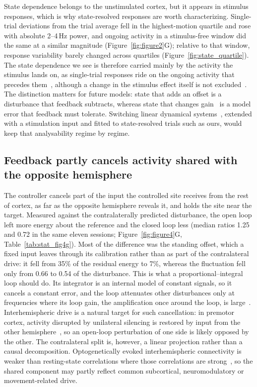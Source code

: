 State dependence belongs to the unstimulated cortex, but it appears in stimulus responses, which is why state-resolved responses are worth characterizing. Single-trial deviations from the trial average fell in the highest-motion quartile and rose with absolute 2--4\,Hz power, and ongoing activity in a stimulus-free window did the same at a similar magnitude (Figure~\ref{fig:figure2}G); relative to that window, response variability barely changed across quartiles (Figure~\ref{fig:state_quartile}). The state dependence we see is therefore carried mainly by the activity the stimulus lands on, as single-trial responses ride on the ongoing activity that precedes them~\citep{Arieli1996,Shimaoka2019}, although a change in the stimulus effect itself is not excluded~\citep{Mateo2011}. The distinction matters for future models: state that adds an offset is a disturbance that feedback subtracts, whereas state that changes gain~\citep{Goris2014} is a model error that feedback must tolerate. Switching linear dynamical systems~\citep{linderman2017rslds}, extended with a stimulation input and fitted to state-resolved trials such as ours, would keep that analysability regime by regime.

\subsection*{Feedback partly cancels activity shared with the opposite hemisphere}

The controller cancels part of the input the controlled site receives from the rest of cortex, as far as the opposite hemisphere reveals it, and holds the site near the target. Measured against the contralaterally predicted disturbance, the open loop left more energy about the reference and the closed loop less (median ratios 1.25 and 0.72 in the same eleven sessions; Figure~\ref{fig:figure4}G, Table~\ref{tab:stat_fig4g}). Most of the difference was the standing offset, which a fixed input leaves through its calibration rather than as part of the contralateral drive: it fell from 35\% of the residual energy to 7\%, whereas the fluctuation fell only from 0.66 to 0.54 of the disturbance. This is what a proportional--integral loop should do. Its integrator is an internal model of constant signals, so it cancels a constant error, and the loop attenuates other disturbances only at frequencies where its loop gain, the amplification once around the loop, is large~\citep{francis1976internal,astrom2008feedback}. Interhemispheric drive is a natural target for such cancellation: in premotor cortex, activity disrupted by unilateral silencing is restored by input from the other hemisphere~\citep{li2016robust}, so an open-loop perturbation of one side is likely opposed by the other. The contralateral split is, however, a linear projection rather than a causal decomposition. Optogenetically evoked interhemispheric connectivity is weaker than resting-state correlations where those correlations are strong~\citep{bauer2018effective}, so the shared component may partly reflect common subcortical, neuromodulatory or movement-related drive.

